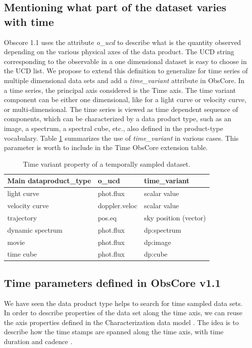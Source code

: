 \documentclass[11pt,a4paper]{ivoa}
\begin{document}
\subsection{Mentioning what part of the dataset varies with time }
\label{sec:timevariant}
Obscore 1.1 uses the attribute \emph{o\_ucd} to describe what is the quantity observed depending on the various physical axes of the data product. The  UCD string corresponding to the observable in  a one dimensional dataset is  easy to choose in the UCD list.  We propose to extend this definition to generalize for time series of multiple dimensional data sets and add a \emph{time\_variant} attribute in ObsCore.
In a time series, the principal axis considered is the Time axis. The time variant component can be either one dimensional, like for a light curve or velocity curve, or multi-dimensional. The time series is viewed as  time dependent sequence of components, which can be characterized  by a data product type, such as an image, a spectrum, a spectral cube, etc., also  defined in the product-type vocabulary. Table \ref{tab:timevar} summarizes the use of \emph{ time\_variant}  in various cases. 
This parameter is worth to include in the Time ObsCore extension table. 

\begin{table}[!htb]
   \begin{center}
  \caption{Time variant property of a temporally sampled dataset.  \label{tab:timevar} }
 
  \begin{small}
  \begin{tabular}{|l|l|l|}
\sptablerule
\textbf{Main dataproduct\_type} & \textbf{o\_ucd}  &\textbf{time\_variant}   \\ \hline
light curve & phot.flux &  scalar value \\ \hline
velocity curve & doppler.veloc & scalar value \\ \hline 
trajectory & pos.eq  &  sky position (vector) \\ \hline
dynamic spectrum & phot.flux & dp:spectrum \\ \hline
movie &   phot.flux & dp:image \\ \hline
time cube & phot.flux & dp:cube \\ \hline
 \end{tabular}
  \end{small}
  \end{center}
 \end{table} 
 
 \subsection{Time parameters defined in ObsCore v1.1}
 \label{sec:alreadythere}
 We have seen the data product type helps to search for time sampled data sets. 
 In order to describe properties of the data set along the time axis, we can reuse the axis properties defined in the Characterization data model \cite{2008ivoa.spec.0325L}.
 The idea is to describe how the time stamps are spanned along the time axis, with time duration and  cadence .
\end{document}
